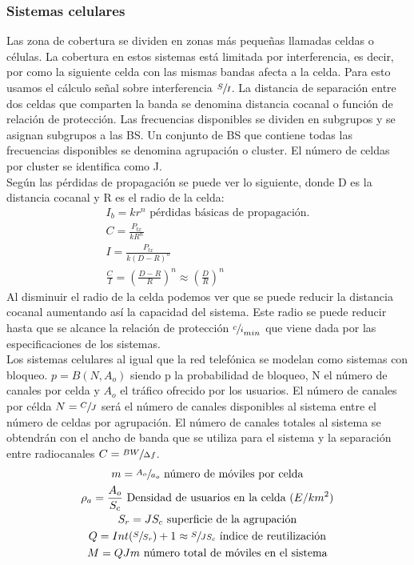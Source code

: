 \subsubsection{Sistemas celulares}
\label{ssub:celulares}
	Las zona de cobertura se dividen en zonas más pequeñas llamadas celdas o células. La cobertura en estos sistemas está limitada por interferencia, es decir, por como la siguiente celda con las mismas bandas afecta a la celda. Para esto usamos el cálculo señal sobre interferencia $\sfrac{S}{I}$. La distancia de separación entre dos celdas que comparten la banda se denomina distancia cocanal o función de relación de protección. Las frecuencias disponibles se dividen en subgrupos y se asignan subgrupos a las BS. Un conjunto de BS que contiene todas las frecuencias disponibles se denomina agrupación o cluster. El número de celdas por cluster se identifica como J.\\
	Según las pérdidas de propagación se puede ver lo siguiente, donde D es la distancia cocanal y R es el radio de la celda:
\begin{gather*}
	I_b=kr^n\text{ pérdidas básicas de propagación.}\\
	C=\frac{P_{tx}}{kR^n}\\
	I=\frac{P_{tx}}{k(D-R)^n}\\
	\frac{C}{I}=(\frac{D-R}{R})^n\approx (\frac{D}{R})^n
\end{gather*}
Al disminuir el radio de la celda podemos ver que se puede reducir la distancia cocanal aumentando así la capacidad del sistema. Este radio se puede reducir hasta que se alcance la relación de protección $\sfrac{c}{i}_{min}$ que viene dada por las especificaciones de los sistemas.\\
Los sistemas celulares al igual que la red telefónica se modelan como sistemas con bloqueo. $p=B(N,A_o)$ siendo p la probabilidad de bloqueo, N el número de canales por celda y $A_o$ el tráfico ofrecido por los usuarios. El número de canales por célda $N=\sfrac{C}{J}$ será el número de canales disponibles al sistema entre el número de celdas por agrupación. El número de canales totales al sistema se obtendrán con el ancho de banda que se utiliza para el sistema y la separación entre radiocanales $C=\sfrac{BW}{\Delta f}$.\\
\begin{gather*}
	m=\sfrac{A_o}{a_o}\text{ número de móviles por celda}\\
	\rho_a=\frac{A_o}{S_c}\text{ Densidad de usuarios en la celda }(E/km^2)\\
	S_r=JS_c\text{ superficie de la agrupación}\\
	Q=Int(\sfrac{S}{S_r})+1\approx \sfrac{S}{JS_c}\text{ índice de reutilización}\\
	M=QJm\text{ número total de móviles en el sistema}\\
\end {gather*}
